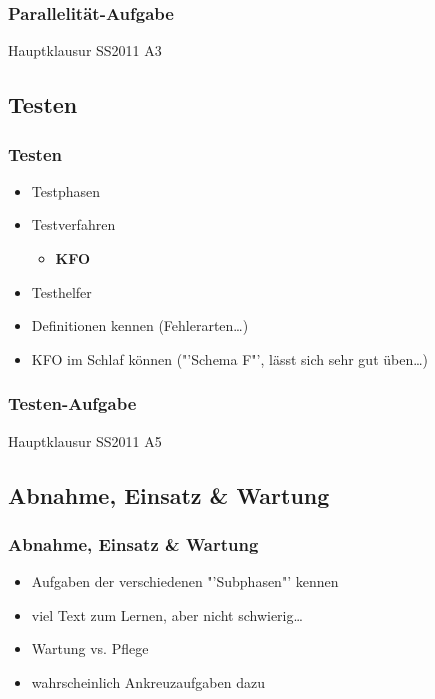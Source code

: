 \documentclass[18pt]{beamer}
\begin{document}
	\begin{frame}
		\frametitle{Parallelität-Aufgabe}
		\begin{huge}
				\centering Hauptklausur SS2011 A3
		\end{huge}
	\end{frame}
	
	\subsection{Testen}
	\begin{frame}
		\frametitle{Testen}
		\begin{itemize}
			\item Testphasen \pause
			\item Testverfahren
			\begin{itemize}
				\item \textbf{KFO} \pause
			\end{itemize}
			\item Testhelfer \pause
			\item Definitionen kennen (Fehlerarten\dots) \pause
			\item KFO im Schlaf können ("'Schema F"', lässt sich sehr gut üben\dots)
		\end{itemize}
	\end{frame}

	\begin{frame}
		\frametitle{Testen-Aufgabe}
		\begin{huge}
			\centering 	Hauptklausur SS2011 A5
		\end{huge}
	\end{frame}
	
	\subsection{Abnahme, Einsatz \& Wartung}
	\begin{frame}
		\frametitle{Abnahme, Einsatz \& Wartung}
		\begin{itemize}
			\item Aufgaben der verschiedenen "'Subphasen"' kennen \pause
			\item viel Text zum Lernen, aber nicht schwierig\dots \pause
			\item Wartung vs. Pflege \pause
			\item wahrscheinlich Ankreuzaufgaben dazu
		\end{itemize}
	\end{frame}
\end{document}
